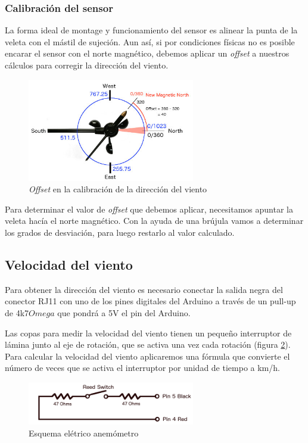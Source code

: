 \documentclass[a4paper, 11pt]{article}
\begin{document}
\subsubsection{Calibración del sensor}
La forma ideal de montage y funcionamiento del sensor es alinear la punta de la veleta con el mástil de sujeción. Aun así, si por condiciones físicas no es posible encarar el sensor con el norte magnético, debemos aplicar un \textit{offset} a nuestros cálculos para corregir la dirección del viento.

\begin{figure}[h]
	\center
	\includegraphics[width=0.65\textwidth]{img/offset.jpg}
	\caption{\textit{Offset} en la calibración de la dirección del viento}
	\label{fig:offset}
\end{figure}

Para determinar el valor de \textit{offset} que debemos aplicar, necesitamos apuntar la veleta hacía el norte magnético. Con la ayuda de una brújula vamos a determinar los grados de desviación, para luego restarlo al valor calculado.
\newpage

\subsection{Velocidad del viento}
Para obtener la dirección del viento es necesario conectar la salida negra del conector RJ11 con uno de los pines digitales del Arduino a través de un pull-up de 4k7$Omega$ que pondrá a 5V el pin del Arduino. 

Las copas para medir la velocidad del viento tienen un pequeño interruptor de lámina junto al eje de rotación, que se activa una vez cada rotación (figura \ref{fig:schema2}). Para calcular la velocidad del viento aplicaremos una fórmula que convierte el número de veces que se activa el interruptor por unidad de tiempo a km/h.

\begin{figure}[h]
	\center
	\includegraphics[width=0.65\textwidth]{img/schema2.png}
	\caption{Esquema elétrico anemómetro}
	\label{fig:schema2}
\end{figure}
\end{document}
